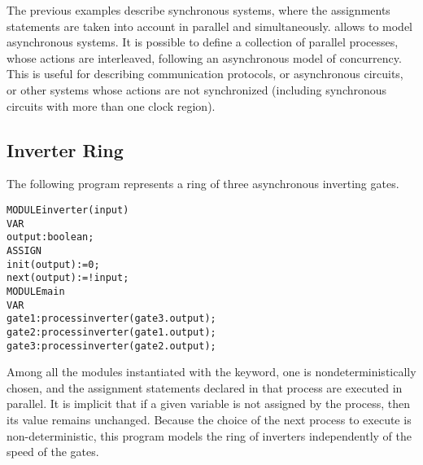 The previous examples describe synchronous systems, where the
assignments statements are taken into account in parallel and
simultaneously. \nusmv allows to model asynchronous systems.  It
is possible to define a collection of parallel processes, whose actions
are interleaved, following an asynchronous model of concurrency. This
is useful for describing communication protocols, or asynchronous
circuits, or other systems whose actions are not synchronized (including
synchronous circuits with more than one clock region).


\subsection{Inverter Ring}
\label{Inverter Ring}

The following program represents a ring of three asynchronous inverting
gates.\\
\begin{alltt}
MODULE inverter(input)
 VAR
   output : boolean;
 ASSIGN
   init(output) := 0;
   next(output) := !input;
MODULE main
 VAR
   gate1 : process inverter(gate3.output);
   gate2 : process inverter(gate1.output);
   gate3 : process inverter(gate2.output);
\end{alltt}
Among all the modules instantiated with the  keyword, one
is nondeterministically chosen, and the assignment statements declared
in that process are executed in parallel. It is implicit that if a given
variable is not assigned by the process, then its value remains
unchanged. Because the choice of the next process to execute is
non-deterministic, this program models the ring of inverters
independently of the speed of the gates. 

